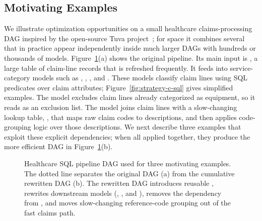 \subsection{Motivating Examples}
\label{sec:motivating-examples}


We illustrate optimization opportunities on a small healthcare claims-processing DAG inspired by the open-source Tuva project~\cite{tuvaProject}; for space it combines several that in practice appear independently inside much larger DAGs with hundreds or thousands of models. Figure~\ref{fig:strategy-c-graph}(a) shows the original pipeline.
Its main input is , a large table of claim-line records that is refreshed frequently. It feeds into 
service-category models such as , , , and . These models classify claim lines using SQL predicates over claim attributes; Figure~\ref{fig:strategy-c-sql} gives simplified examples. The  model excludes claim lines already categorized as equipment, so it reads  as an exclusion list. The  model joins claim lines with a 
slow-changing lookup table, , that maps raw claim codes to descriptions, and then applies code-grouping logic over those descriptions. We next describe three examples that exploit these explicit dependencies; when all applied together, they produce the more efficient DAG in Figure~\ref{fig:strategy-c-graph}(b).

\begin{figure}[t]
\inv
\centering
{ }
\inv
\caption{Healthcare SQL pipeline DAG used for three motivating examples. The dotted line separates the original DAG (a) from the cumulative rewritten DAG (b). The rewritten DAG introduces reusable , rewrites downstream models (, , and ), removes the  dependency from , and moves slow-changing reference-code grouping out of the fast claims path. }
\label{fig:strategy-c-graph}
\end{figure}

